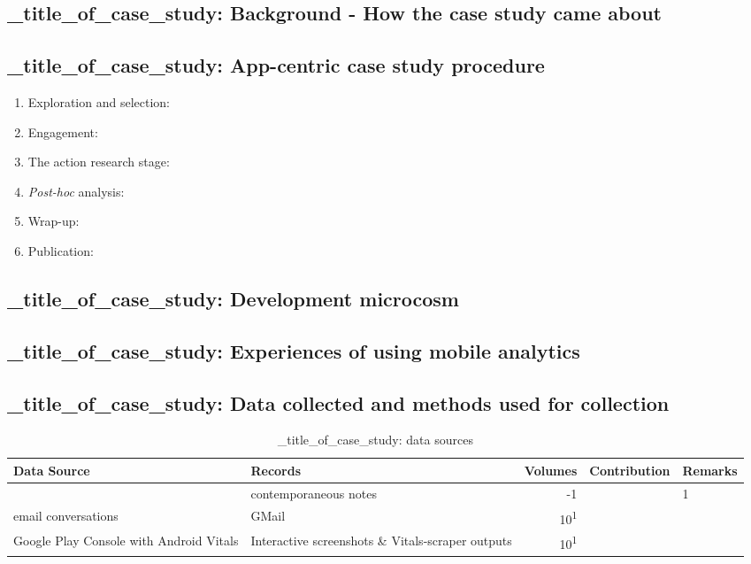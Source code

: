 \subsection{_title_of_case_study: Background - How the case study came about}

\subsection{_title_of_case_study: App-centric case study procedure}
{\small
\begin{enumerate}
    \itemsep0em
    \item Exploration and selection:
    \item Engagement:
    \item The action research stage:
    \item \textit{Post-hoc} analysis:
    \item Wrap-up:
    \item Publication:
\end{enumerate}
}


\subsection{_title_of_case_study: Development microcosm}

\subsection{_title_of_case_study: Experiences of using mobile analytics}

\subsection{_title_of_case_study: Data collected and methods used for collection}

\begin{table}
    \centering
    \footnotesize
    \tabcolsep=0.15cm
    \begin{tabular}{p{2.6cm}p{2.6cm}rp{3.5cm}p{3.5cm}}
        Data Source & Records & Volumes & Contribution & Remarks \\
        \toprule
          & contemporaneous notes\footnotemark & -1 &  & 1  \\
         email conversations & GMail & 10\textsuperscript{1} &  &  \\
         Google Play Console with Android Vitals &Interactive screenshots \& Vitals-scraper outputs &10\textsuperscript{1} &  &  \\
         \bottomrule
    \end{tabular}
    \caption{_title_of_case_study: data sources}
    \label{tab:blank_case_study-data-sources}
\end{table}


